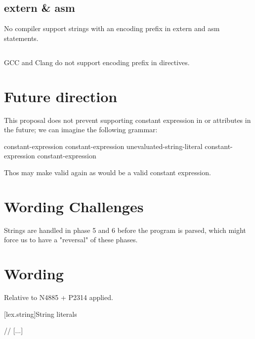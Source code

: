 \documentclass{wg21}
\begin{document}
\subsection{extern \& asm}

No compiler support strings with an encoding prefix in extern and asm statements.

\subsection{}

GCC and  Clang do not support encoding prefix in  directives.

\section{Future direction}

This proposal does not prevent supporting constant expression in  or attributes in
the future; we can imagine the following grammar:

\begin{bnf}
    \br
     \terminal{(} constant-expression \terminal{)} \terminal{;}\br
     \terminal{(} constant-expression \terminal{,} unevaluated-string-literal \terminal{)} \terminal{;}\br
     \terminal{(} constant-expression \terminal{,} constant-expression \terminal{)} \terminal{;}
\end{bnf}

Thos may make  valid again as  would be a valid constant expression.

\section{Wording Challenges}

Strings are handled in phase 5 and 6 before the program is parsed,
which might force us to have a "reversal" of these phases.

\section{Wording}

Relative to N4885 + P2314 applied.

[lex.string]{String literals}

// [...]
\end{document}
